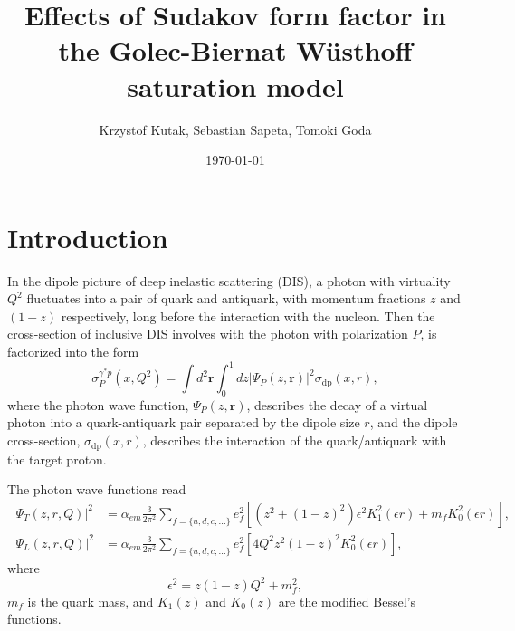 \documentclass[11pt]{article}
\begin{document}
\author{Krzystof Kutak, Sebastian Sapeta, Tomoki Goda
}	 
\title{ Effects of Sudakov form factor in\\ the
Golec-Biernat W\"usthoff saturation model}
\date{\today}
\maketitle



\begin{abstract}

\end{abstract}

\section{Introduction}


In the dipole picture of deep inelastic scattering (DIS), a photon with virtuality $Q^2$ fluctuates into a pair of quark and antiquark, with momentum fractions $z$ and $(1-z)$ respectively, long before the interaction with the nucleon. Then the cross-section of inclusive DIS involves with the photon with polarization $P$, is factorized into the form \cite{gbw1998}%
\begin{equation}
\sigma^{\gamma^* p}_{P}(x,Q^2)=\int d^2 \mathbf{r} \int^1_0 dz |\Psi_{P}(z,\mathbf{r})|^2 \sigma_{\mathrm{dp}}(x,r),
\label{eq:factorization}
\end{equation}
where the photon wave function, $\Psi_P(z, \mathbf{r}) $, describes the decay of a virtual photon into a quark-antiquark pair separated by the dipole size $r$, and the dipole cross-section, $\sigma_{\mathrm{dp}}(x,r)$, describes the interaction of the quark/antiquark with the target proton. 

The photon wave functions read  \cite{gbw1998}%
\begin{align}
|\Psi_{T}(z,r,Q)|^2 & =\alpha_{em}\frac{3}{2\pi^2}\sum_{f=\{u,d,c,\dots\}} e^2_f \left[ (z^2+(1-z)^2) \epsilon^2 K_1^2(\epsilon r) +m_f K_0^2(\epsilon r) \right],\\
|\Psi_{L}(z,r,Q)|^2 & =\alpha_{em}\frac{3}{2\pi^2}\sum_{f=\{u,d,c,\dots\}} e^2_f \left[ 4Q^2 z^2(1-z)^2 K_0^2(\epsilon r)
\right],
\end{align}
where 
\begin{equation}
\epsilon^2 =z(1-z) Q^2 +m_f^2,
\end{equation}
$m_f$ is the quark mass,
and $K_1(z)$ and $K_0(z)$ are the modified Bessel's functions.
\end{document}
